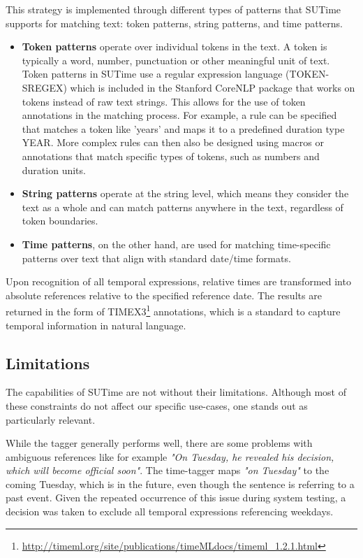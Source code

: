 \documentclass[a4paper,10pt]{report}
\begin{document}
This strategy is implemented through different types of patterns that SUTime supports for matching text: token patterns, string patterns, and time patterns.

\begin{itemize}
  \item \textbf{Token patterns} operate over individual tokens in the text. A token is typically a word, number, punctuation or other meaningful unit of text. Token patterns in SUTime use a regular expression language (TOKEN-SREGEX) which is included in the Stanford CoreNLP package that works on tokens instead of raw text strings. This allows for the use of token annotations in the matching process. For example, a rule can be specified that matches a token like 'years' and maps it to a predefined duration type YEAR. More complex rules can then also be designed using macros or annotations that match specific types of tokens, such as numbers and duration units.

  \item \textbf{String patterns} operate at the string level, which means they consider the text as a whole and can match patterns anywhere in the text, regardless of token boundaries.

  \item \textbf{Time patterns}, on the other hand, are used for matching time-specific patterns over text that align with standard date/time formats.
\end{itemize}

Upon recognition of all temporal expressions, relative times are transformed into absolute references relative to the specified reference date. The results are returned in the form of TIMEX3\footnote{\url{http://timeml.org/site/publications/timeMLdocs/timeml\_1.2.1.html}} annotations, which is a standard to capture temporal information in natural language. \cite{sutime}

\subsection{Limitations}
\label{sutime_limitations}
The capabilities of SUTime are not without their limitations. Although most of these constraints do not affect our specific use-cases, one stands out as particularly relevant.

While the tagger generally performs well, there are some problems with ambiguous references like for example \textit{"On Tuesday, he revealed his decision, which will become official soon"}. The time-tagger maps \textit{"on Tuesday"} to the coming Tuesday, which is in the future, even though the sentence is referring to a past event. Given the repeated occurrence of this issue during system testing, a decision was taken to exclude all temporal expressions referencing weekdays. \cite{sutime}
\end{document}
